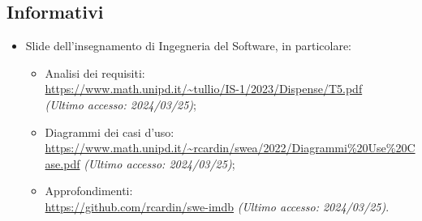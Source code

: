 \subsection{Informativi}
\begin{itemize}
    \item Slide dell’insegnamento di Ingegneria del Software, in particolare:
        \begin{itemize}
            \item Analisi dei requisiti: \\ \url{https://www.math.unipd.it/~tullio/IS-1/2023/Dispense/T5.pdf}\\ \textit{(Ultimo accesso: 2024/03/25)};
            \item Diagrammi dei casi d'uso:\\ \url{https://www.math.unipd.it/~rcardin/swea/2022/Diagrammi%20Use%20Case.pdf} \textit{(Ultimo accesso: 2024/03/25)};
            \item Approfondimenti:\\ \url{https://github.com/rcardin/swe-imdb} \textit{(Ultimo accesso: 2024/03/25)}.
        \end{itemize}
\end{itemize}
